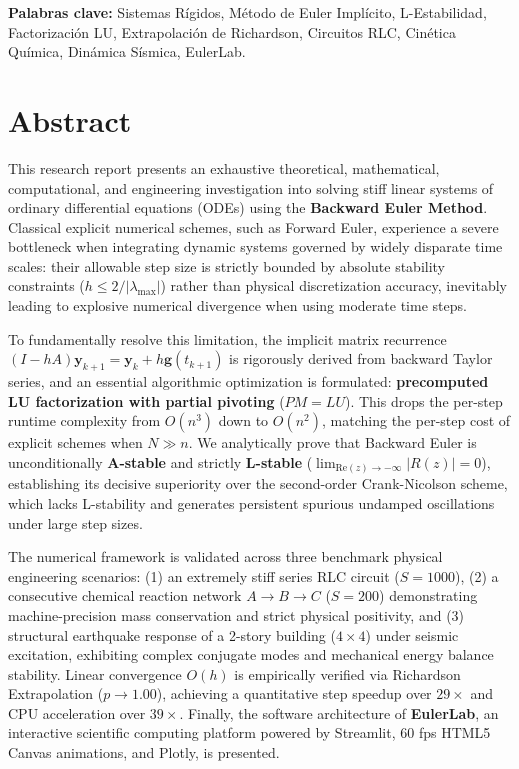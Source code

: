 \documentclass[11pt,a4paper]{article}
\begin{document}
\vspace{0.8cm}
\noindent\textbf{Palabras clave:} Sistemas Rígidos, Método de Euler Implícito, L-Estabilidad, Factorización LU, Extrapolación de Richardson, Circuitos RLC, Cinética Química, Dinámica Sísmica, EulerLab.

\newpage
\section*{Abstract}

This research report presents an exhaustive theoretical, mathematical, computational, and engineering investigation into solving stiff linear systems of ordinary differential equations (ODEs) using the \textbf{Backward Euler Method}. Classical explicit numerical schemes, such as Forward Euler, experience a severe bottleneck when integrating dynamic systems governed by widely disparate time scales: their allowable step size is strictly bounded by absolute stability constraints ($h \le 2/|\lambda_{\max}|$) rather than physical discretization accuracy, inevitably leading to explosive numerical divergence when using moderate time steps.

To fundamentally resolve this limitation, the implicit matrix recurrence $(I - hA)\mathbf{y}_{k+1} = \mathbf{y}_k + h\mathbf{g}(t_{k+1})$ is rigorously derived from backward Taylor series, and an essential algorithmic optimization is formulated: \textbf{precomputed LU factorization with partial pivoting} ($PM = LU$). This drops the per-step runtime complexity from $O(n^3)$ down to $O(n^2)$, matching the per-step cost of explicit schemes when $N \gg n$. We analytically prove that Backward Euler is unconditionally \textbf{A-stable} and strictly \textbf{L-stable} ($\lim_{\text{Re}(z) \to -\infty} |R(z)| = 0$), establishing its decisive superiority over the second-order Crank-Nicolson scheme, which lacks L-stability and generates persistent spurious undamped oscillations under large step sizes.

The numerical framework is validated across three benchmark physical engineering scenarios: (1) an extremely stiff series RLC circuit ($S = 1000$), (2) a consecutive chemical reaction network $A \to B \to C$ ($S = 200$) demonstrating machine-precision mass conservation and strict physical positivity, and (3) structural earthquake response of a 2-story building ($4 \times 4$) under seismic excitation, exhibiting complex conjugate modes and mechanical energy balance stability. Linear convergence $O(h)$ is empirically verified via Richardson Extrapolation ($p \to 1.00$), achieving a quantitative step speedup over $29\times$ and CPU acceleration over $39\times$. Finally, the software architecture of \textbf{EulerLab}, an interactive scientific computing platform powered by Streamlit, 60 fps HTML5 Canvas animations, and Plotly, is presented.
\end{document}
